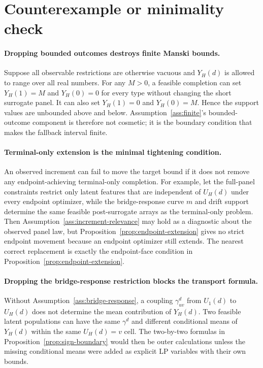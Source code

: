 \documentclass[11pt]{article}
\theoremstyle{definition}
\theoremstyle{plain}
\theoremstyle{remark}
\begin{document}
\section{Counterexample or minimality check}
\paragraph{Dropping bounded outcomes destroys finite Manski bounds.}
Suppose all observable restrictions are otherwise vacuous and \(Y_H(d)\) is allowed to range over all real numbers.  For any \(M>0\), a feasible completion can set \(Y_H(1)=M\) and \(Y_H(0)=0\) for every type without changing the short surrogate panel.  It can also set \(Y_H(1)=0\) and \(Y_H(0)=M\).  Hence the support values are unbounded above and below.  Assumption~\ref{ass:finite}'s bounded-outcome component is therefore not cosmetic; it is the boundary condition that makes the fallback interval finite.

\paragraph{Terminal-only extension is the minimal tightening condition.}
An observed increment can fail to move the target bound if it does not remove any endpoint-achieving terminal-only completion.  For example, let the full-panel constraints restrict only latent features that are independent of \(U_H(d)\) under every endpoint optimizer, while the bridge-response curve \(m\) and drift support determine the same feasible post-surrogate arrays as the terminal-only problem.  Then Assumption~\ref{ass:increment-relevance} may hold as a diagnostic about the observed panel law, but Proposition~\ref{prop:endpoint-extension} gives no strict endpoint movement because an endpoint optimizer still extends.  The nearest correct replacement is exactly the endpoint-face condition in Proposition~\ref{prop:endpoint-extension}.

\paragraph{Dropping the bridge-response restriction blocks the transport formula.}
Without Assumption~\ref{ass:bridge-response}, a coupling \(\gamma^d_{uv}\) from \(U_1(d)\) to \(U_H(d)\) does not determine the mean contribution of \(Y_H(d)\).  Two feasible latent populations can have the same \(\gamma^d\) and different conditional means of \(Y_H(d)\) within the same \(U_H(d)=v\) cell.  The two-by-two formulas in Proposition~\ref{prop:sign-boundary} would then be outer calculations unless the missing conditional means were added as explicit LP variables with their own bounds.
\end{document}
